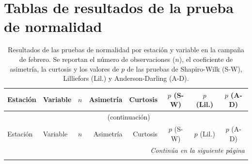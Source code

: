 \chapter{Tablas de resultados de la prueba de normalidad}
\label{anexo:normal}

\begin{longtable}{@{}llrrrccc@{}}
\caption{Resultados de las pruebas de normalidad por estación y variable en la campaña de febrero. Se reportan el número de observaciones ($n$), el coeficiente de asimetría, la curtosis y los valores de $p$ de las pruebas de Shapiro-Wilk (S-W), Lilliefors (Lil.) y Anderson-Darling (A-D).}
\label{tab:normalidad_feb}\\
\toprule
Estación & Variable & $n$ & Asimetría & Curtosis & $p$ (S-W) & $p$ (Lil.) & $p$ (A-D) \\
\midrule
\endfirsthead

\multicolumn{8}{c}{\tablename~\thetable{} (continuación)}\\
\toprule
Estación & Variable & $n$ & Asimetría & Curtosis & $p$ (S-W) & $p$ (Lil.) & $p$ (A-D) \\
\midrule
\endhead

\midrule
\multicolumn{8}{r}{\textit{Continúa en la siguiente página}}\\
\endfoot

\bottomrule
\endlastfoot


\end{longtable}
